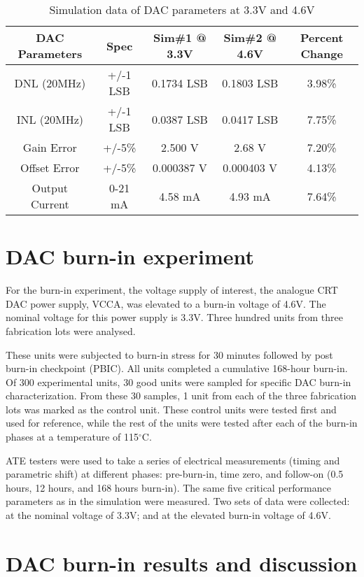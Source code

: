 \documentclass[11pt,a4paper]{article}
\begin{document}
\begin{table}[t]
\centering
\caption{Simulation data of DAC parameters at 3.3V and 4.6V}
\label{table 13}
\begin{tabular}{|c|c|c|c|c|} \hline
DAC Parameters & Spec & Sim\#1 @ 3.3V & Sim\#2 @ 4.6V & Percent Change\\
\hline
DNL (20MHz)& +/-1 LSB& 0.1734 LSB& 0.1803 LSB& 3.98\%\\
INL (20MHz)& +/-1 LSB&0.0387 LSB&0.0417 LSB&7.75\%\\
Gain Error&+/-5\%&2.500 V&2.68 V&7.20\%\\
Offset Error&+/-5\%&0.000387 V&0.000403 V&4.13\%\\
Output Current&0-21 mA &4.58 mA&4.93 mA&7.64\%\\
\hline
\end{tabular}
\end{table}



\section{DAC burn-in experiment}

For the burn-in experiment, the voltage supply of interest, the analogue CRT DAC power supply, VCCA, was elevated to a burn-in voltage of 4.6V. The nominal voltage for this power supply is 3.3V.  Three hundred units from three fabrication lots were analysed.

These units were subjected to burn-in stress for 30 minutes followed by post burn-in checkpoint (PBIC). All units completed a cumulative 168-hour burn-in. Of 300 experimental units, 30 good units were sampled for specific DAC burn-in characterization. From these 30 samples, 1 unit from each of the three fabrication lots was marked as the control unit. These control units were tested first and used for reference, while the rest of the units were tested after each of the burn-in phases at a temperature of 115$^\circ$C.

ATE testers were used to take a series of electrical measurements (timing and parametric shift)   at different phases: pre-burn-in, time zero, and follow-on (0.5 hours, 12 hours, and 168 hours burn-in). The same five critical performance parameters as in the simulation were measured. Two sets of data were collected: at the nominal voltage of 3.3V; and at the elevated burn-in voltage of 4.6V.  

\section{DAC burn-in results and discussion}
\end{document}
